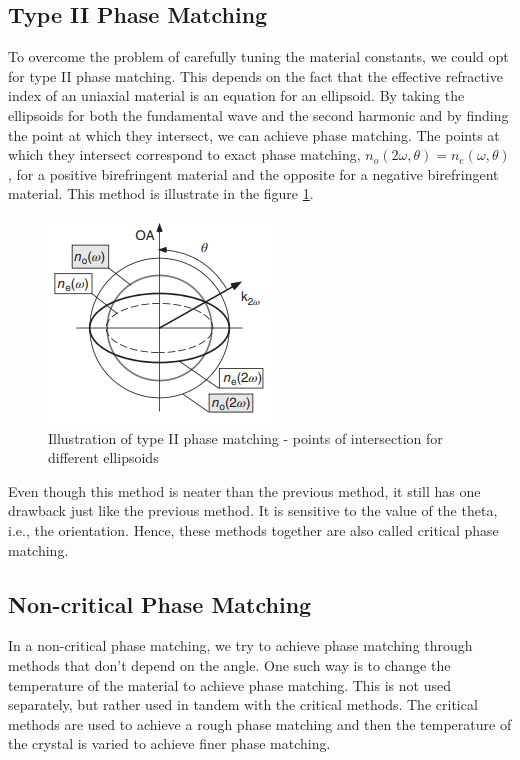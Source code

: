 \subsection{Type II Phase Matching}
To overcome the problem of carefully tuning the material constants, we could opt for type II phase matching. This depends on the fact that the effective refractive index of an uniaxial material is an equation for an ellipsoid. By taking the ellipsoids for both the fundamental wave and the second harmonic and by finding the point at which they intersect, we can achieve phase matching. The points at which they intersect correspond to exact phase matching, $n_o(2\omega, \theta) = n_e(\omega, \theta)$, for a positive birefringent material and the opposite for a negative birefringent material. This method is illustrate in the figure \ref{fig:phasematching}.\\
\begin{figure}[h!]
\centering
\includegraphics[width = 6 cm]{phase-matching.png}
\caption{Illustration of type II phase matching - points of intersection for different ellipsoids\cite{mes}}
\label{fig:phasematching}
\end{figure}
Even though this method is neater than the previous method, it still has one drawback just like the previous method. It is sensitive to the value of the theta, i.e., the orientation. Hence, these methods together are also called critical phase matching.

\subsection{Non-critical Phase Matching}
In a non-critical phase matching, we try to achieve phase matching through methods that don't depend on the angle. One such way is to change the temperature of the material to achieve phase matching. This is not used separately, but rather used in tandem with the critical methods. The critical methods are used to achieve a rough phase matching and then the temperature of the crystal is varied to achieve finer phase matching.


